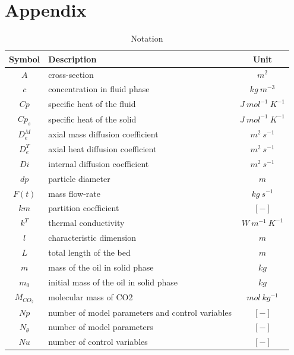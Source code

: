 \documentclass[a4paper,fleqn]{cas-dc}
\begin{document}
\clearpage \appendix \label{appendix}
\section{Appendix} 

\newpage
\begin{table}[p]
		\caption{Notation}
		\label{tab::symbols}
		\begin{tabular}{ |c|l|c| } 
			\hline
			Symbol 		& 	Description 							& Unit 						\\ \hline
			$A$			&	cross-section							& $m^2$ 					\\ \hline
			$c$			&	concentration in fluid phase			& $kg ~ m^{-3}$				\\ \hline
			$Cp$		&	specific heat of the fluid				& $J ~ mol^{-1} ~ K^{-1}$ 	\\ \hline
			$Cp_s$		&	specific heat of the solid				& $J ~ mol^{-1} ~ K^{-1}$ 	\\ \hline
			$D_e^M$		&	axial mass diffusion coefficient		& $m^2 ~ s^{-1}$			\\ \hline
			$D_e^T$		&	axial heat diffusion coefficient		& $m^2 ~ s^{-1}$			\\ \hline
			$Di$		&	internal diffusion coefficient			& $m^2 ~ s^{-1}$			\\ \hline
			$dp$		&	particle diameter						& $m$						\\ \hline
			$F(t)$		&	mass flow-rate							& $kg ~ s^{-1}$				\\ \hline
			$km$		&	partition coefficient					& $[-]$						\\ \hline
			$k^T$		&	thermal conductivity					& $W ~ m^{-1} ~ K^{-1}$		\\ \hline
			$l$			&	characteristic dimension				& $m$						\\ \hline
			$L$			&	total length of the bed					& $m$						\\ \hline
			$m$			&	mass of the oil in solid phase			& $kg$						\\ \hline
			$m_0$		&	initial mass of the oil in solid phase	& $kg$						\\ \hline
			$M_{CO_2}$	&	molecular mass of CO2					& $mol ~ kg^{-1}$			\\ \hline
			$Np$		&	number of model parameters and control variables & $[-]$			\\ \hline
			$N_{\theta}$&	number of model parameters				& $[-]$						\\ \hline
			$Nu$		&	number of control variables				& $[-]$						\\ \hline

\end{tabular}
\end{table}
\end{document}
